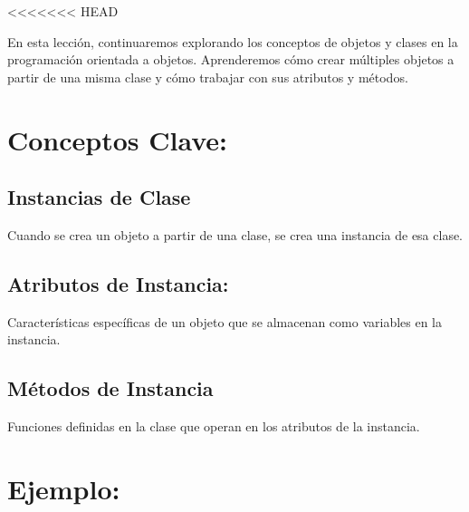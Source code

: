 \documentclass[
  a4paper,
  onepage,
  openany]{scrreprt}
\begin{document}
\textless\textless\textless\textless\textless\textless\textless{} HEAD

En esta lección, continuaremos explorando los conceptos de objetos y
clases en la programación orientada a objetos. Aprenderemos cómo crear
múltiples objetos a partir de una misma clase y cómo trabajar con sus
atributos y métodos.

\hypertarget{conceptos-clave-50}{%
\section{Conceptos Clave:}\label{conceptos-clave-50}}

\hypertarget{instancias-de-clase}{%
\subsection{Instancias de Clase}\label{instancias-de-clase}}

Cuando se crea un objeto a partir de una clase, se crea una instancia de
esa clase.

\hypertarget{atributos-de-instancia}{%
\subsection{Atributos de Instancia:}\label{atributos-de-instancia}}

Características específicas de un objeto que se almacenan como variables
en la instancia.

\hypertarget{muxe9todos-de-instancia}{%
\subsection{Métodos de Instancia}\label{muxe9todos-de-instancia}}

Funciones definidas en la clase que operan en los atributos de la
instancia.

\hypertarget{ejemplo-50}{%
\section{Ejemplo:}\label{ejemplo-50}}
\end{document}
